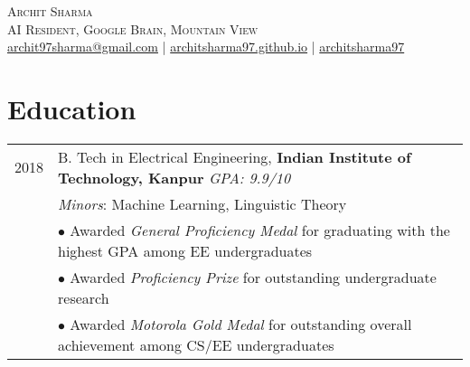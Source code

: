 \documentclass[a4paper,10pt]{article}
\begin{document}

\pagestyle{empty} %


\par{\centering
		{\hspace{-2mm}\Huge \textsc{Archit Sharma}
	}\\\large \textsc{AI Resident, Google Brain, Mountain View}\\\normalsize \Letter\hspace{1mm}\href{mailto:archit97sharma@gmail.com}{archit97sharma@gmail.com} | \Mundus\hspace{1mm}\href{https://architsharma97.github.io/}{ architsharma97.github.io} | \faGithub \hspace{0mm} \href{https://github.com/architsharma97/}{architsharma97} \par}
	
\section{Education}
\begin{tabular}{rp{16.5cm}}	
\textsc{2018} & B. Tech in Electrical Engineering, \textbf{Indian Institute of Technology, Kanpur}  \hfill \textit{GPA: \textsc{9.9/10}}\\
         & \textit{Minors}: Machine Learning, Linguistic Theory\\
         & \small $\bullet$ Awarded \textit{General Proficiency Medal} for graduating with the highest GPA among EE undergraduates\\
         & \small $\bullet$ Awarded \textit{Proficiency Prize} for outstanding undergraduate research\\
         & \small $\bullet$ Awarded \textit{Motorola Gold Medal} for outstanding overall achievement among CS/EE undergraduates \\
\end{tabular}
\end{document}
